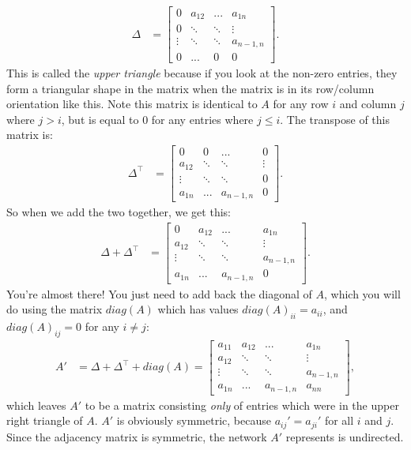 \begin{align*}
    \Delta &= \begin{bmatrix}
        0 & {a_{12}} & {...} & {a_{1n}} \\
        {0} & \ddots & {\ddots} & {\vdots} \\
        {\vdots} &{\ddots} &\ddots & {a_{n-1, n}}\\
        {0} & {...} & {0} & 0
    \end{bmatrix}.
\end{align*}
This is called the \emph{upper triangle} because if you look at the non-zero entries, they form a triangular shape in the matrix when the matrix is in its row/column orientation like this. Note this matrix is identical to $A$ for any row $i$ and column $j$ where $j > i$, but is equal to $0$ for any entries where $j \leq i$. The transpose of this matrix is:
\begin{align*}
    \Delta^\top &= \begin{bmatrix}
        0 & {0} & {...} &{0}\\
        {a_{12}}& \ddots & {\ddots} & {\vdots} \\
        {\vdots}&{\ddots} & \ddots & {0} \\
        {a_{1n}}&{...} &{a_{n-1,n}} & 0
    \end{bmatrix}.
\end{align*}
So when we add the two together, we get this:
\begin{align*}
    \Delta + \Delta^\top &= \begin{bmatrix}
        0 & {a_{12}} & {...} & {a_{1n}} \\
        {a_{12}} & \ddots & {\ddots} & {\vdots} \\
        {\vdots}&{\ddots} &\ddots & {a_{n-1, n}}\\
        {a_{1n}}&{...} &{a_{n-1,n}} & 0
    \end{bmatrix}.
\end{align*}
You're almost there! You just need to add back the diagonal of $A$, which you will do using the matrix $diag(A)$ which has values $diag(A)_{ii} = a_{ii}$, and $diag(A)_{ij} = 0$ for any $i \neq j$:
\begin{align*}
    A' &= \Delta + \Delta^\top + diag(A) = \begin{bmatrix}
        a_{11} & {a_{12}} & {...} & {a_{1n}} \\
        {a_{12}} & \ddots & {\ddots} & {\vdots} \\
        {\vdots}&{\ddots} &\ddots & {a_{n-1, n}}\\
        {a_{1n}}&{...} &{a_{n-1,n}} & a_{nn}
    \end{bmatrix},
\end{align*}
which leaves $A'$ to be a matrix consisting \emph{only} of entries which were in the upper right triangle of $A$. $A'$ is obviously symmetric, because $a_{ij}' = a_{ji}'$ for all $i$ and $j$. Since the adjacency matrix is symmetric, the network $A'$ represents is undirected.

